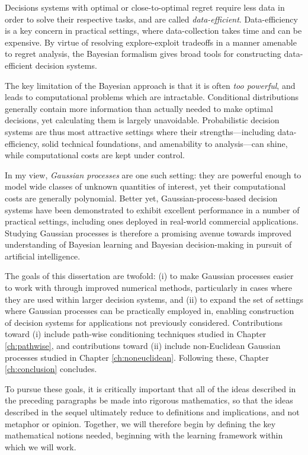 \documentclass[11pt]{book}
\begin{document}
Decisions systems with optimal or close-to-optimal regret require less data in order to solve their respective tasks, and are called \emph{data-efficient}.
Data-efficiency is a key concern in practical settings, where data-collection takes time and can be expensive.
By virtue of resolving explore-exploit tradeoffs in a manner amenable to regret analysis, the Bayesian formalism gives broad tools for constructing data-efficient decision systems.

The key limitation of the Bayesian approach is that it is often \emph{too powerful}, and leads to computational problems which are intractable.
Conditional distributions generally contain more information than actually needed to make optimal decisions, yet calculating them is largely unavoidable.
Probabilistic decision systems are thus most attractive settings where their strengths---including data-efficiency, solid technical foundations, and amenability to analysis---can shine, while computational costs are kept under control.

In my view, \emph{Gaussian processes} are one such setting: they are powerful enough to model wide classes of unknown quantities of interest, yet their computational costs are generally polynomial.
Better yet, Gaussian-process-based decision systems have been demonstrated to exhibit excellent performance in a number of practical settings, including ones deployed in real-world commercial applications.
Studying Gaussian processes is therefore a promising avenue towards improved understanding of Bayesian learning and Bayesian decision-making in pursuit of artificial intelligence.

The goals of this dissertation are twofold: (i) to make Gaussian processes easier to work with through improved numerical methods, particularly in cases where they are used within larger decision systems, and (ii) to expand the set of settings where Gaussian processes can be practically employed in, enabling construction of decision systems for applications not previously considered.
Contributions toward (i) include path-wise conditioning techniques studied in Chapter \ref{ch:pathwise}, and contributions toward (ii) include non-Euclidean Gaussian processes studied in Chapter \ref{ch:noneuclidean}.
Following these, Chapter \ref{ch:conclusion} concludes.

To pursue these goals, it is critically important that all of the ideas described in the preceding paragraphs be made into rigorous mathematics, so that the ideas described in the sequel ultimately reduce to definitions and implications, and not metaphor or opinion.
Together, we will therefore begin by defining the key mathematical notions needed, beginning with the learning framework within which we will work.
\end{document}
